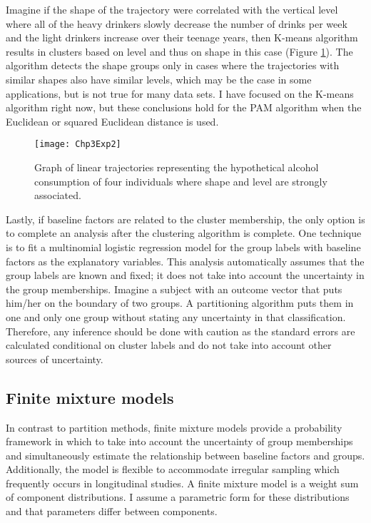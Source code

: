 Imagine if the shape of the trajectory were correlated with the vertical level where all of the heavy drinkers slowly decrease the number of drinks per week and the light drinkers increase over their teenage years, then K-means algorithm results in clusters based on level and thus on shape in this case (Figure \ref{fig:3-2}). The algorithm detects the shape groups only in cases where the trajectories with similar shapes also have similar levels, which may be the case in some applications, but is not true for many data sets. I have focused on the K-means algorithm right now, but these conclusions hold for the PAM algorithm when the Euclidean or squared Euclidean distance is used.
\begin{figure}
\begin{center}
\texttt{[image: Chp3Exp2]}
\end{center}
\caption{Graph of linear trajectories representing the hypothetical alcohol consumption of four individuals where shape and level are strongly associated.}
\label{fig:3-2} 
\end{figure}

Lastly, if baseline factors are related to the cluster membership, the only option is to complete an analysis after the clustering algorithm is complete. One technique is to fit a multinomial logistic regression model for the group labels with baseline factors as the explanatory variables. This analysis automatically assumes that the group labels are known and fixed; it does not take into account the uncertainty in the group memberships. Imagine a subject with an outcome vector that puts him/her on the boundary of two groups. A partitioning algorithm puts them in one and only one group without stating any uncertainty in that classification. Therefore, any inference should be done with caution as the standard errors are calculated conditional on cluster labels and do not take into account other sources of uncertainty.

\subsection{Finite mixture models}
In contrast to partition methods, finite mixture models provide a probability framework in which to take into account the uncertainty of group memberships and simultaneously estimate the relationship between baseline factors and groups. Additionally, the model is flexible to accommodate irregular sampling which frequently occurs in longitudinal studies. A finite mixture model is a weight sum of component distributions. I assume a parametric form for these distributions and that parameters differ between components.

